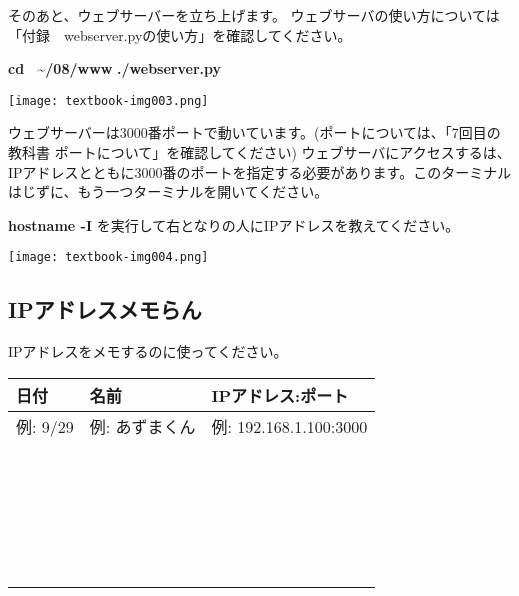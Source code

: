 \clearpage
そのあと、ウェブサーバーを立ち上げます。
ウェブサーバの使い方については「付録　webserver.pyの使い方」を確認してください。

\textbf{cd \ {\textasciitilde}/08/www}
\textbf{./webserver.py}

\begin{center}
  \texttt{[image: textbook-img003.png]}
\end{center}

ウェブサーバーは3000番ポートで動いています。(ポートについては、「7回目の教科書
ポートについて」を確認してください)%
ウェブサーバにアクセスするは、IPアドレスとともに3000番のポートを指定する必要があります。このターミナルはじずに、もう一つターミナルを開いてください。

\textbf{hostname -I}
を実行して右となりの人にIPアドレスを教えてください。

\begin{center}
  \texttt{[image: textbook-img004.png]}
\end{center}

\clearpage
\subsection*{IPアドレスメモらん}
IPアドレスをメモするのに使ってください。

\begin{center}
\tablefirsthead{}
\tablehead{}
\tabletail{}
\tablelasttail{}
\begin{supertabular}{|m{5.4690003cm}|m{5.4690003cm}|m{5.4690003cm}|}
\hline
日付 & 名前 & IPアドレス:ポート \\\hline
例: 9/29 & 例: あずまくん & 例: 192.168.1.100:3000\\\hline
\vspace{1.6cm} ~ ~ ~ ~ & ~ & ~ \\\hline
\vspace{1.6cm} ~ ~ ~ ~ & ~ & ~ \\\hline
\vspace{1.6cm} ~ ~ ~ ~ & ~ & ~ \\\hline
\vspace{1.6cm} ~ ~ ~ ~ & ~ & ~ \\\hline
\vspace{1.6cm} ~ ~ ~ ~ & ~ & ~ \\\hline
\end{supertabular}
\end{center}

